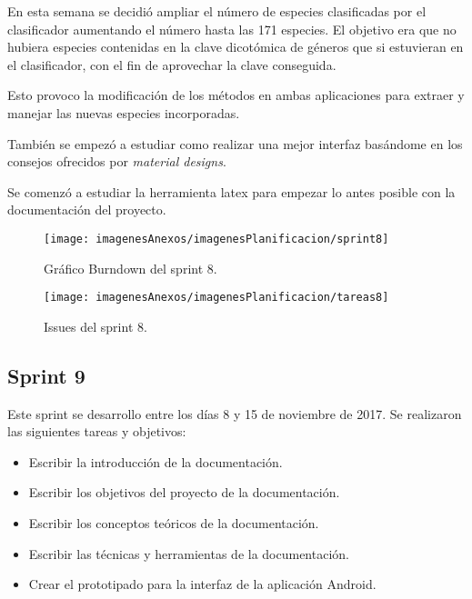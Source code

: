 En esta semana se decidió ampliar el número de especies clasificadas por el clasificador aumentando el número hasta las 171 especies. El objetivo era que no hubiera especies contenidas en la clave dicotómica de géneros que si estuvieran en el clasificador, con el fin de aprovechar la clave conseguida.

Esto provoco la modificación de los métodos en ambas aplicaciones para extraer y manejar las nuevas especies incorporadas.

También se empezó a estudiar como realizar una mejor interfaz basándome en los consejos ofrecidos por \textit{material designs}.

Se comenzó a estudiar la herramienta latex para empezar lo antes posible con la documentación del proyecto.

\begin{figure}[h]
    \begin{center}%
        \begin{center}%
          \texttt{[image: imagenesAnexos/imagenesPlanificacion/sprint8]}%
          \caption{Gráfico Burndown del sprint 8.}%
          \label{figSprint8}%
        \end{center}%
  	\end{center}%
\end{figure}%

\begin{figure}[h]
    \begin{center}%
        \begin{center}%
          \texttt{[image: imagenesAnexos/imagenesPlanificacion/tareas8]}%
          \caption{Issues del sprint 8.}%
          \label{figTareas8}%
        \end{center}%
  	\end{center}%
\end{figure}%

\newpage

\subsection{Sprint 9}

Este sprint se desarrollo entre los días 8 y 15 de noviembre de 2017. Se realizaron las siguientes tareas y objetivos:

\begin{itemize}
	\item Escribir la introducción de la documentación.
	\item Escribir los objetivos del proyecto de la documentación.
	\item Escribir los conceptos teóricos de la documentación.
	\item Escribir las técnicas y herramientas de la documentación.
	\item Crear el prototipado para la interfaz de la aplicación Android.
\end{itemize}

